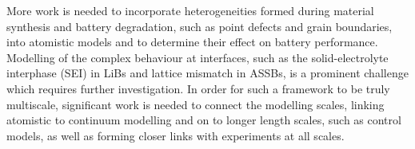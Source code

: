 \documentclass[../main.tex]{subfiles}
\begin{document}
More work is needed to incorporate heterogeneities formed during material synthesis and battery degradation,\cite{Edge2021,Birkl2017,Zulke2021} such as point defects \cite{mercer_influence_2017,schlueter_quantifying_2018,squires_2020,Swift2021,hoang2016defect} and grain boundaries,\cite{dean2021overscreening,Kim2020,symington2021elucidating} into atomistic models and to determine their effect on battery performance. Modelling of the complex behaviour at interfaces, such as the solid-electrolyte interphase (SEI) in LiBs and lattice mismatch in ASSBs, is a prominent challenge which requires further investigation.  In order for such a framework to be truly multiscale, significant work is needed to connect the modelling scales, linking atomistic to continuum modelling and on to longer length scales, such as control models, as well as forming closer links with experiments at all scales.
\end{document}

